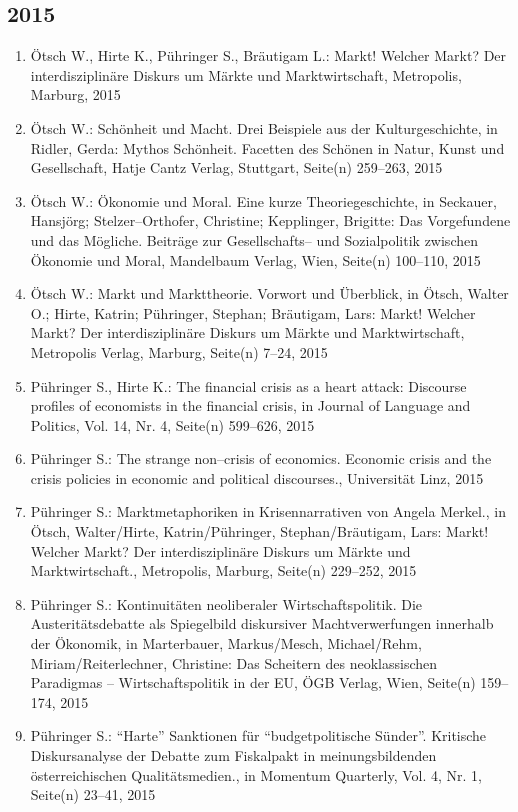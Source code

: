 \subsection*{2015}
\begin{enumerate}
    	 \item Ötsch W., Hirte K., Pühringer S., Bräutigam L.: Markt! Welcher Markt? Der interdisziplinäre Diskurs um Märkte und Marktwirtschaft, Metropolis, Marburg, 2015
	 \item Ötsch W.: Schönheit und Macht. Drei Beispiele aus der Kulturgeschichte, in Ridler, Gerda: Mythos Schönheit. Facetten des Schönen in Natur, Kunst und Gesellschaft, Hatje Cantz Verlag, Stuttgart, Seite(n) 259--263, 2015
	 \item Ötsch W.: Ökonomie und Moral. Eine kurze Theoriegeschichte, in Seckauer, Hansjörg; Stelzer--Orthofer, Christine; Kepplinger, Brigitte: Das Vorgefundene und das Mögliche. Beiträge zur Gesellschafts-- und Sozialpolitik zwischen Ökonomie und Moral, Mandelbaum Verlag, Wien, Seite(n) 100--110, 2015
	 \item Ötsch W.: Markt und Markttheorie. Vorwort und Überblick, in Ötsch, Walter O.; Hirte, Katrin; Pühringer, Stephan; Bräutigam, Lars: Markt! Welcher Markt? Der interdisziplinäre Diskurs um Märkte und Marktwirtschaft, Metropolis Verlag, Marburg, Seite(n) 7--24, 2015
	 \item Pühringer S., Hirte K.: The financial crisis as a heart attack: Discourse profiles of economists in the financial crisis, in Journal of Language and Politics, Vol. 14, Nr. 4, Seite(n) 599--626, 2015
	 \item Pühringer S.: The strange non--crisis of economics. Economic crisis and the crisis policies in economic and political discourses., Universität Linz, 2015
	 \item Pühringer S.: Marktmetaphoriken in Krisennarrativen von Angela Merkel., in Ötsch, Walter/Hirte, Katrin/Pühringer, Stephan/Bräutigam, Lars: Markt! Welcher Markt? Der interdisziplinäre Diskurs um Märkte und Marktwirtschaft., Metropolis, Marburg, Seite(n) 229--252, 2015
	 \item Pühringer S.: Kontinuitäten neoliberaler Wirtschaftspolitik. Die Austeritätsdebatte als Spiegelbild diskursiver Machtverwerfungen innerhalb der Ökonomik, in Marterbauer, Markus/Mesch, Michael/Rehm, Miriam/Reiterlechner, Christine: Das Scheitern des neoklassischen Paradigmas – Wirtschaftspolitik in der EU, ÖGB Verlag, Wien, Seite(n) 159--174, 2015
	 \item Pühringer S.: “Harte” Sanktionen für “budgetpolitische Sünder”. Kritische Diskursanalyse der Debatte zum Fiskalpakt in meinungsbildenden österreichischen Qualitätsmedien., in Momentum Quarterly, Vol. 4, Nr. 1, Seite(n) 23--41, 2015

\end{enumerate}
